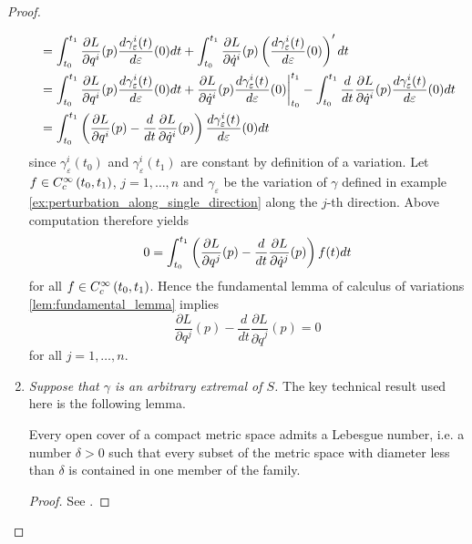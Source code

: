 \begin{proof}
\begin{enumerate}[label = \textit{Step \arabic*:},wide=0pt]
\begin{align*}
				&= \int_{t_0}^{t_1} \frac{\partial L}{\partial q^i}(p)\frac{d\gamma_\varepsilon^i(t)}{d\varepsilon}(0)dt + \int_{t_0}^{t_1}\frac{\partial L}{\partial \dot{q}^i}(p)\del[3]{\frac{d\gamma_\varepsilon^i(t)}{d\varepsilon}(0)}'dt\\
				&= \int_{t_0}^{t_1} \frac{\partial L}{\partial q^i}(p)\frac{d\gamma_\varepsilon^i(t)}{d\varepsilon}(0)dt + \frac{\partial L}{\partial \dot{q}^i}(p)\frac{d\gamma_\varepsilon^i(t)}{d\varepsilon}(0)\bigg\vert_{t_0}^{t_1} - \int_{t_0}^{t_1} \frac{d}{dt}\frac{\partial L}{\partial \dot{q}^i}(p)\frac{d\gamma_\varepsilon^i(t)}{d\varepsilon}(0)dt\\
				&= \int_{t_0}^{t_1} \del[3]{\frac{\partial L}{\partial q^i}(p) - \frac{d}{dt}\frac{\partial L}{\partial \dot{q}^i}(p)}\frac{d\gamma_\varepsilon^i(t)}{d\varepsilon}(0)dt 
			\end{align*}
			\noindent since $\gamma^i_\varepsilon(t_0)$ and $\gamma^i_\varepsilon(t_1)$ are constant by definition of a variation. Let $f \in C^\infty_c\intoo[0]{t_0,t_1}$, $j = 1,\dots,n$ and $\gamma_\varepsilon$ be the variation of $\gamma$ defined in example \ref{ex:perturbation_along_single_direction} along the $j$-th direction. Above computation therefore yields
			\begin{equation*}
				0 = \int_{t_0}^{t_1} \del[3]{\frac{\partial L}{\partial q^j}(p) - \frac{d}{dt}\frac{\partial L}{\partial \dot{q}^j}(p)}f(t) dt
			\end{equation*}
			\noindent for all $f \in C^\infty_c\intoo[0]{t_0,t_1}$. Hence the fundamental lemma of calculus of variations \ref{lem:fundamental_lemma} implies
			\begin{equation*}
				\frac{\partial L}{\partial q^j}(p) - \frac{d}{dt}\frac{\partial L}{\partial \dot{q}^j}(p) = 0
			\end{equation*}
			\noindent for all $j = 1,\dots,n$.
		\item \textit{Suppose that $\gamma$ is an arbitrary extremal of $S$.} The key technical result used here is the following lemma.
			\begin{lemma}
				\label{lem:Lebesgue_number_lemma}
				Every open cover of a compact metric space admits a Lebesgue number, i.e. a number $\delta > 0$ such that every subset of the metric space with diameter less than $\delta$ is contained in one member of the family.
			\end{lemma}

			\begin{proof}
				See \cite[194]{lee:topological_manifolds:2011}.
			\end{proof}


\end{enumerate}
\end{proof}
